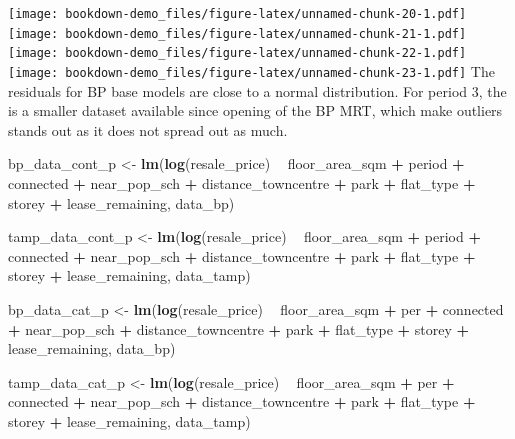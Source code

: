 \documentclass[]{book}
\newenvironment{Shaded}{\begin{snugshade}}{\end{snugshade}}
\newcommand{\KeywordTok}[1]{\textcolor[rgb]{0.13,0.29,0.53}{\textbf{#1}}}
\newcommand{\StringTok}[1]{\textcolor[rgb]{0.31,0.60,0.02}{#1}}
\newcommand{\OperatorTok}[1]{\textcolor[rgb]{0.81,0.36,0.00}{\textbf{#1}}}
\newcommand{\NormalTok}[1]{#1}
\begin{document}
\texttt{[image: bookdown-demo\_files/figure-latex/unnamed-chunk-20-1.pdf]}
\texttt{[image: bookdown-demo\_files/figure-latex/unnamed-chunk-21-1.pdf]}
\texttt{[image: bookdown-demo\_files/figure-latex/unnamed-chunk-22-1.pdf]}
\texttt{[image: bookdown-demo\_files/figure-latex/unnamed-chunk-23-1.pdf]}
The residuals for BP base models are close to a normal distribution. For
period 3, the is a smaller dataset available since opening of the BP
MRT, which make outliers stands out as it does not spread out as much.

\begin{Shaded}
\begin{Highlighting}[]
\NormalTok{bp_data_cont_p <-}\StringTok{ }\KeywordTok{lm}\NormalTok{(}\KeywordTok{log}\NormalTok{(resale_price) }\OperatorTok{~}\StringTok{ }\NormalTok{floor_area_sqm }\OperatorTok{+}\StringTok{ }\NormalTok{period }\OperatorTok{+}\StringTok{ }\NormalTok{connected }\OperatorTok{+}\StringTok{ }\NormalTok{near_pop_sch }\OperatorTok{+}\StringTok{ }\NormalTok{distance_towncentre }\OperatorTok{+}\StringTok{ }\NormalTok{park }\OperatorTok{+}\StringTok{ }\NormalTok{flat_type }\OperatorTok{+}\StringTok{ }\NormalTok{storey }\OperatorTok{+}\StringTok{ }\NormalTok{lease_remaining, data_bp)}

\NormalTok{tamp_data_cont_p <-}\StringTok{ }\KeywordTok{lm}\NormalTok{(}\KeywordTok{log}\NormalTok{(resale_price) }\OperatorTok{~}\StringTok{ }\NormalTok{floor_area_sqm }\OperatorTok{+}\StringTok{ }\NormalTok{period }\OperatorTok{+}\StringTok{ }\NormalTok{connected }\OperatorTok{+}\StringTok{ }\NormalTok{near_pop_sch }\OperatorTok{+}\StringTok{ }\NormalTok{distance_towncentre }\OperatorTok{+}\StringTok{ }\NormalTok{park }\OperatorTok{+}\StringTok{ }\NormalTok{flat_type }\OperatorTok{+}\StringTok{ }\NormalTok{storey }\OperatorTok{+}\StringTok{ }\NormalTok{lease_remaining, data_tamp)}

\NormalTok{bp_data_cat_p <-}\StringTok{ }\KeywordTok{lm}\NormalTok{(}\KeywordTok{log}\NormalTok{(resale_price) }\OperatorTok{~}\StringTok{ }\NormalTok{floor_area_sqm }\OperatorTok{+}\StringTok{ }\NormalTok{per }\OperatorTok{+}\StringTok{ }\NormalTok{connected }\OperatorTok{+}\StringTok{ }\NormalTok{near_pop_sch }\OperatorTok{+}\StringTok{ }\NormalTok{distance_towncentre }\OperatorTok{+}\StringTok{ }\NormalTok{park }\OperatorTok{+}\StringTok{ }\NormalTok{flat_type }\OperatorTok{+}\StringTok{ }\NormalTok{storey }\OperatorTok{+}\StringTok{ }\NormalTok{lease_remaining, data_bp)}

\NormalTok{tamp_data_cat_p <-}\StringTok{ }\KeywordTok{lm}\NormalTok{(}\KeywordTok{log}\NormalTok{(resale_price) }\OperatorTok{~}\StringTok{ }\NormalTok{floor_area_sqm }\OperatorTok{+}\StringTok{ }\NormalTok{per }\OperatorTok{+}\StringTok{ }\NormalTok{connected }\OperatorTok{+}\StringTok{ }\NormalTok{near_pop_sch }\OperatorTok{+}\StringTok{ }\NormalTok{distance_towncentre }\OperatorTok{+}\StringTok{ }\NormalTok{park }\OperatorTok{+}\StringTok{ }\NormalTok{flat_type }\OperatorTok{+}\StringTok{ }\NormalTok{storey }\OperatorTok{+}\StringTok{ }\NormalTok{lease_remaining, data_tamp)}
\end{Highlighting}
\end{Shaded}
\end{document}
